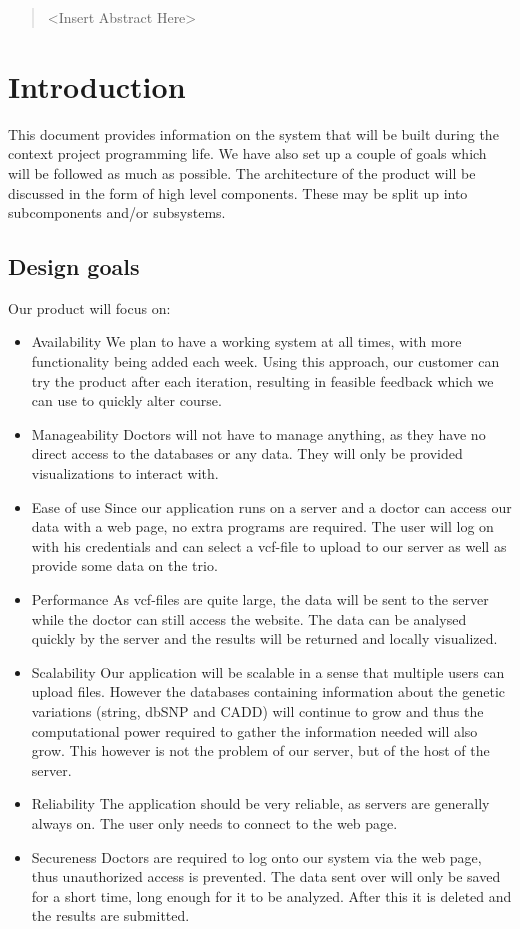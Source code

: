 \documentclass[a4paper]{article}
\begin{document}
	
	
	\begin{abstract}
		\textless Insert Abstract Here\textgreater
	\end{abstract}
	\clearpage
	
	\tableofcontents
	\clearpage
	
	\section{Introduction}
		This document provides information on the system that will be built during the context project programming life. We have also set up a couple of goals which will be followed as much as possible. The architecture of the product will be discussed in the form of high level components. These may be split up into subcomponents and/or subsystems.
		\subsection{Design goals}
		Our product will focus on:
		\begin{itemize}
			\item Availability
				\subitem We plan to have a working system at all times, with more functionality being added each week. Using this approach, our customer can try the product after each iteration, resulting in feasible feedback which we can use to quickly alter course.
			\item Manageability
				\subitem Doctors will not have to manage anything, as they have no direct access to the databases or any data. They will only be provided visualizations to interact with.
			\item Ease of use
				\subitem Since our application runs on a server and a doctor can access our data with a web page, no extra programs are required. The user will log on with his credentials and can select a vcf-file to upload to our server as well as provide some data on the trio.
			\item Performance
				\subitem As vcf-files are quite large, the data will be sent to the server while the doctor can still access the website. The data can be analysed quickly by the server and the results will be returned and locally visualized.
			\item Scalability
				\subitem Our application will be scalable in a sense that multiple users can upload files. However the databases containing information about the genetic variations (string, dbSNP and CADD) will continue to grow and thus the computational power required to gather the information needed will also grow. This however is not the problem of our server, but of the host of the server.
			\item Reliability
				\subitem The application should be very reliable, as servers are generally always on. The user only needs to connect to the web page.
			\item Secureness
				\subitem Doctors are required to log onto our system via the web page, thus unauthorized access is prevented. The data sent over will only be saved for a short time, long enough for it to be analyzed. After this it is deleted and the results are submitted.
		\end{itemize}
\end{document}
